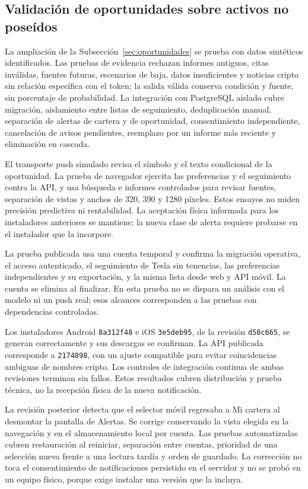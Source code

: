 \clearpage
\subsection{Validación de oportunidades sobre activos no poseídos}\label{sec:pruebas-oportunidades}

La ampliación de la Subsección~\ref{sec:oportunidades} se prueba con datos sintéticos identificados. Las pruebas de evidencia rechazan informes antiguos, citas inválidas, fuentes futuras, escenarios de baja, datos insuficientes y noticias cripto sin relación específica con el token; la salida válida conserva condición y fuente, sin porcentaje de probabilidad. La integración con PostgreSQL aislado cubre migración, aislamiento entre listas de seguimiento, deduplicación manual, separación de alertas de cartera y de oportunidad, consentimiento independiente, cancelación de avisos pendientes, reemplazo por un informe más reciente y eliminación en cascada.

El transporte push simulado revisa el símbolo y el texto condicional de la oportunidad. La prueba de navegador ejercita las preferencias y el seguimiento contra la API, y usa búsqueda e informes controlados para revisar fuentes, separación de vistas y anchos de 320, 390 y 1280 píxeles. Estos ensayos no miden precisión predictiva ni rentabilidad. La aceptación física informada para los instaladores anteriores se mantiene; la nueva clase de alerta requiere probarse en el instalador que la incorpore.

La prueba publicada usa una cuenta temporal y confirma la migración operativa, el acceso autenticado, el seguimiento de Tesla sin tenencias, las preferencias independientes y su exportación, y la misma lista desde web y API móvil. La cuenta se elimina al finalizar. En esta prueba no se dispara un análisis con el modelo ni un push real; esos alcances corresponden a las pruebas con dependencias controladas.

Los instaladores Android \texttt{8a312f48} e iOS \texttt{3e5deb95}, de la revisión \texttt{d58c665}, se generan correctamente y sus descargas se confirman. La API publicada corresponde a \texttt{2174898}, con un ajuste compatible para evitar coincidencias ambiguas de nombres cripto. Los controles de integración continua de ambas revisiones terminan sin fallos. Estos resultados cubren distribución y prueba técnica, no la recepción física de la nueva notificación.

La revisión posterior detecta que el selector móvil regresaba a Mi cartera al desmontar la pantalla de Alertas. Se corrige conservando la vista elegida en la navegación y en el almacenamiento local por cuenta. Las pruebas automatizadas cubren restauración al reiniciar, separación entre cuentas, prioridad de una selección nueva frente a una lectura tardía y orden de guardado. La corrección no toca el consentimiento de notificaciones persistido en el servidor y no se probó en un equipo físico, porque exige instalar una versión que la incluya.

